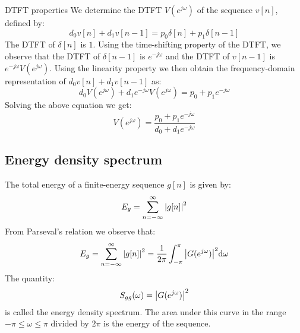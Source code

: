 \documentclass[../../main/main.tex]{subfiles}
\begin{document}
\begin{example}{DTFT properties}{}
    We determine the DTFT \( V(e^{j\omega}) \) of the sequence \( v[n] \), defined by:
    \begin{equation}
        d_{0}v[n] + d_{1}v[n-1]
        =
        p_{0}\delta[n] + p_{1}\delta[n-1]
        \label{eq:L09_S05_1}
    \end{equation}
    The DTFT of \( \delta[n] \) is \( 1 \). Using the time-shifting property of the DTFT, we observe that the DTFT of \( \delta[n-1] \) is \( e^{-j\omega} \) and the DTFT of \( v[n-1] \) is \( e^{-j\omega} V(e^{j\omega}) \). Using the linearity property we then obtain the frequency-domain representation of \( d_{0}v[n] + d_{1}v[n-1] \) as:
    \begin{equation}
        d_{0}V(e^{j\omega}) + d_{1}e^{-j\omega}V(e^{j\omega})
        =
        p_{0} + p_{1}e^{-j\omega}
        \label{eq:L09_S06_2}
    \end{equation}
    Solving the above equation we get:
    \begin{equation}
        V(e^{j\omega})
        =
        \frac{p_{0} + p_{1}e^{-j\omega}}{d_{0} + d_{1}e^{-j\omega}}
        \label{eq:L09_S06_3}
    \end{equation}
\end{example}



\subsection{Energy density spectrum}
The total energy of a finite-energy sequence \( g[n] \) is given by:
\begin{equation}
    E_{g}
    =
    \sum_{n=-\infty}^{\infty} \abs{g[n]}^2
    \label{eq:L09_S07_1}
\end{equation}
From Parseval's relation we observe that:
\begin{equation}
    E_{g}
    =
    \sum_{n=-\infty}^{\infty} \abs{g[n]}^2
    =
    \frac{1}{2\pi} \int_{-\pi}^{\pi} \abs{G(e^{j\omega})}^2 \mathrm{d}{\omega}
    \label{eq:L09_S07_2}
\end{equation}
The quantity:
\begin{equation}
    S_{gg}(\omega)
    =
    \abs{G(e^{j\omega})}^2
    \label{eq:L09_S08_1}
\end{equation}
is called the energy density spectrum. The area under this curve in the range \( -\pi \le \omega \le \pi \) divided by \( 2\pi \) is the energy of the sequence.
\end{document}
